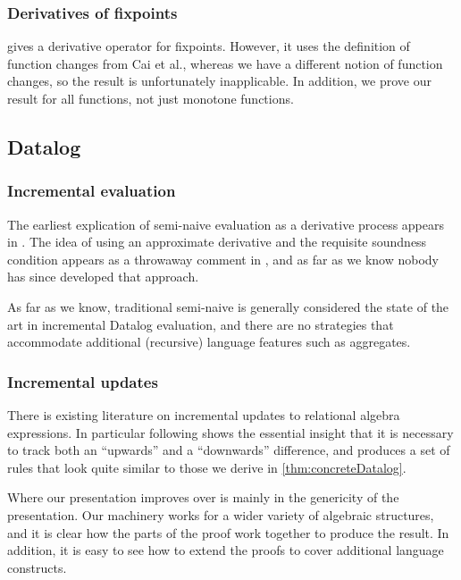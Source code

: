 \subsubsection{Derivatives of fixpoints}

\textcite{arntz2017fixpoints} gives a derivative operator for fixpoints. However,
it uses the definition of function changes from Cai et al., whereas
we have a different notion of function changes, so the result is unfortunately
inapplicable. In addition, we prove our result for all functions, not just
monotone functions.

\subsection{Datalog}

\subsubsection{Incremental evaluation}

The earliest explication of semi-naive evaluation as a derivative process
appears in \textcite{bancilhon1986naive}. The idea of using an approximate derivative
and the requisite soundness condition appears as a throwaway comment in
\textcite{bancilhon1986amateur}, and as far as we know nobody has since
developed that approach. 

As far as we know, traditional semi-naive is generally considered the state of
the art in incremental Datalog evaluation, and there are no strategies that
accommodate additional (recursive) language features such as aggregates.

\subsubsection{Incremental updates}

There is existing literature on incremental updates to relational algebra
expressions. In particular \textcite{griffin1997improved} following
\textcite{qian1991incremental} shows the essential insight that it is necessary to
track both an ``upwards'' and a ``downwards'' difference, and produces a set of
rules that look quite similar to those we derive in \cref{thm:concreteDatalog}.

Where our presentation improves over \citeauthor{griffin1997improved} is mainly in
the genericity of the presentation. Our machinery works for a wider variety of
algebraic structures, and it is clear how the parts of the proof work together
to produce the result. In addition, it is easy to see how to extend the proofs
to cover additional language constructs.

